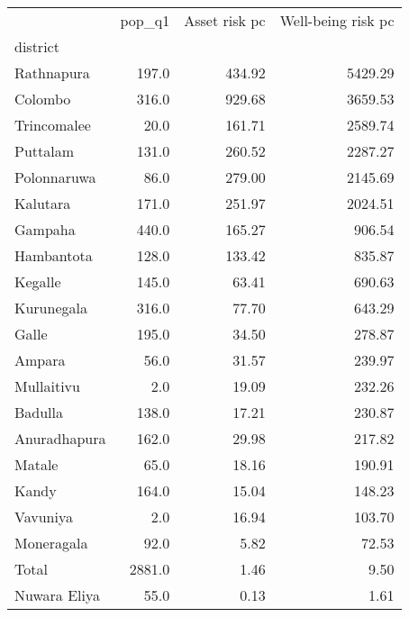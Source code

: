 \begin{tabular}{lrrr}
\toprule
{} &  pop\_q1 &  Asset risk pc &  Well-being risk pc \\
district     &         &                &                     \\
\midrule
Rathnapura   &   197.0 &         434.92 &             5429.29 \\
Colombo      &   316.0 &         929.68 &             3659.53 \\
Trincomalee  &    20.0 &         161.71 &             2589.74 \\
Puttalam     &   131.0 &         260.52 &             2287.27 \\
Polonnaruwa  &    86.0 &         279.00 &             2145.69 \\
Kalutara     &   171.0 &         251.97 &             2024.51 \\
Gampaha      &   440.0 &         165.27 &              906.54 \\
Hambantota   &   128.0 &         133.42 &              835.87 \\
Kegalle      &   145.0 &          63.41 &              690.63 \\
Kurunegala   &   316.0 &          77.70 &              643.29 \\
Galle        &   195.0 &          34.50 &              278.87 \\
Ampara       &    56.0 &          31.57 &              239.97 \\
Mullaitivu   &     2.0 &          19.09 &              232.26 \\
Badulla      &   138.0 &          17.21 &              230.87 \\
Anuradhapura &   162.0 &          29.98 &              217.82 \\
Matale       &    65.0 &          18.16 &              190.91 \\
Kandy        &   164.0 &          15.04 &              148.23 \\
Vavuniya     &     2.0 &          16.94 &              103.70 \\
Moneragala   &    92.0 &           5.82 &               72.53 \\
Total        &  2881.0 &           1.46 &                9.50 \\
Nuwara Eliya &    55.0 &           0.13 &                1.61 \\
\bottomrule
\end{tabular}
